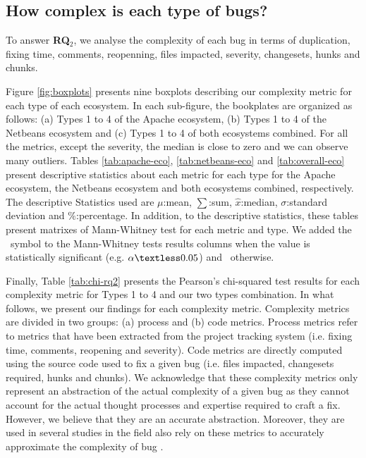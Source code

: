 
\subsection{How complex is each type of bugs?}

To answer {\bf RQ$_2$}, we analyse the complexity of each bug in terms of duplication, fixing time, comments, reopenning, files impacted, severity, changesets, hunks and chunks.

Figure \ref{fig:boxplots} presents nine boxplots describing our complexity metric for each type of each ecosystem.
In each sub-figure, the bookplates are organized as follows: (a) Types 1 to 4 of the Apache ecosystem, (b) Types 1 to 4 of the Netbeans ecosystem and (c) Types 1 to 4 of both ecosystems combined.
For all the metrics, except the severity, the median is close to zero and we can observe many outliers.
Tables \ref{tab:apache-eco}, \ref{tab:netbeans-eco} and \ref{tab:overall-eco} present descriptive statistics about each metric for each type for the Apache ecosystem, the Netbeans ecosystem and both ecosystems combined, respectively.
The descriptive Statistics used are $\mu$:mean, $\sum$:sum, $\hat{x}$:median, $\sigma$:standard deviation and $\%$:percentage.
In addition, to the descriptive statistics, these tables present matrixes of Mann-Whitney test for each metric and type.
We added the \checkmark~symbol to the Mann-Whitney tests results columns when the value is statistically significant (e.g. $\alpha \textless 0.05$) and \xmark~otherwise.

Finally, Table \ref{tab:chi-rq2} presents the Pearson's chi-squared test results for each complexity metric for Types 1 to 4 and our two types combination.
In what follows, we present our findings for each complexity metric.
Complexity metrics are divided in two groups: (a) process and (b) code metrics.
Process metrics refer to metrics that have been extracted from the project tracking system (i.e. fixing time, comments, reopening and severity).
Code metrics are directly computed using the source code used to fix a given bug (i.e. files impacted, changesets required, hunks and chunks).
We acknowledge that these complexity metrics only represent an abstraction of the actual complexity of a given bug as they cannot account for the actual thought processes and expertise required to craft a fix.
However, we believe that they are an accurate abstraction.
Moreover, they are used in several studies in the field also rely on these metrics to accurately approximate the complexity of bug \cite{Weiß2007,Saha2014,Nam2013,Anvik2006,Nagappan}.

